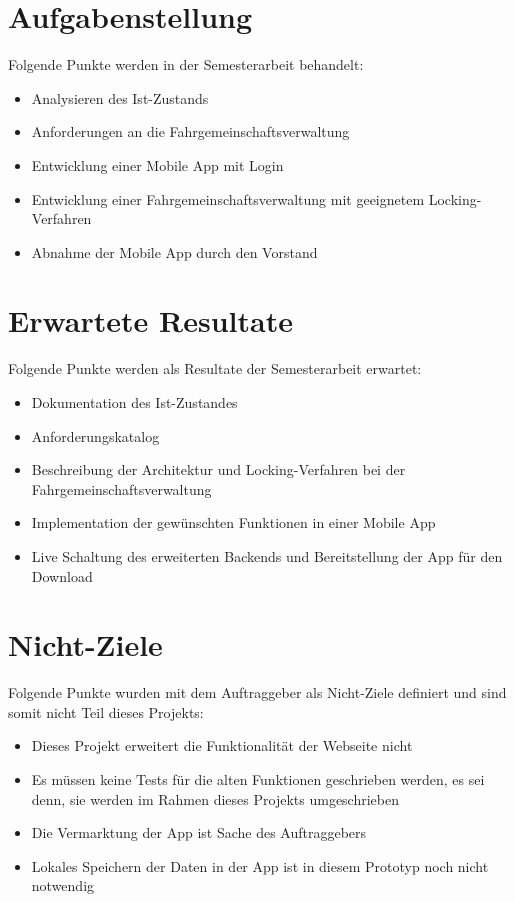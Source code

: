 \section{Aufgabenstellung}\label{aufgabenstellung}
Folgende Punkte werden in der Semesterarbeit behandelt:
\begin{itemize}
\item Analysieren des Ist-Zustands
\item Anforderungen an die Fahrgemeinschaftsverwaltung
\item Entwicklung einer Mobile App mit Login
\item Entwicklung einer Fahrgemeinschaftsverwaltung mit geeignetem Locking-Verfahren
\item Abnahme der Mobile App durch den Vorstand
\end{itemize}

\section{Erwartete Resultate}\label{erwartete_resultate}
Folgende Punkte werden als Resultate der Semesterarbeit erwartet:
\begin{itemize}
\item Dokumentation des Ist-Zustandes
\item Anforderungskatalog
\item Beschreibung der Architektur und Locking-Verfahren bei der Fahrgemeinschaftsverwaltung
\item Implementation der gewünschten Funktionen in einer Mobile App
\item Live Schaltung des erweiterten Backends und Bereitstellung der App für den Download
\end{itemize}

\section{Nicht-Ziele}\label{nicht_ziele}
Folgende Punkte wurden mit dem Auftraggeber als Nicht-Ziele definiert und sind somit nicht Teil dieses Projekts:
\begin{itemize}
\item Dieses Projekt erweitert die Funktionalität der Webseite nicht
\item Es müssen keine Tests für die alten Funktionen geschrieben werden, es sei denn, sie werden im Rahmen dieses Projekts umgeschrieben
\item Die Vermarktung der App ist Sache des Auftraggebers
\item Lokales Speichern der Daten in der App ist in diesem Prototyp noch nicht notwendig
\end{itemize}

